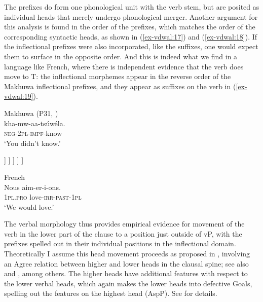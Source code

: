\documentclass[output=paper
,modfonts
,nonflat]{langsci/langscibook}
\begin{document}
The prefixes do form one phonological unit with the verb stem, but are posited as individual heads that merely undergo phonological merger. Another argument for this analysis is found in the order of the prefixes, which matches the order of the corresponding syntactic heads, as shown in (\ref{ex-vdwal:17}) and (\ref{ex-vdwal:18}). If the inflectional prefixes were also incorporated, like the suffixes, one would expect them to surface in the opposite order. And this is indeed what we find in a language like French, where there is independent evidence that the verb does move to T: the inflectional morphemes appear in the reverse order of the Makhuwa inflectional prefixes, and they appear as suffixes on the verb in (\ref{ex-vdwal:19}). 

\begin{exe}
		\ex Makhuwa (P31, \citealt[169]{Van_der_Wal2009})\label{ex-vdwal:17} \\
		\gll kha-mw-aa-tsúwéla.\\
		\textsc{neg}-\textsc{2pl}-\textsc{impf}-know\\
		\glt `You didn’t know.'
\end{exe}

\begin{exe}
	\ex\label{ex-vdwal:18} 
		\begin{forest}
			[NegP
			[kha-] 
			[AgrSP
			[-mw-] 
			[TAM
			[-aa-]
			[AspP
			[-tsuwela\textsubscript{i}]
			[vP [t\textsubscript{i}, roof
			]
			] ] ] ]	]			
	\end{forest}
\end{exe}
	\begin{exe}
		\ex French \label{ex-vdwal:19} \\
		\gll Nous aim-er-i-ons.\\
		1\textsc{pl}.\textsc{pro} love-\textsc{irr}-\textsc{past}-1\textsc{pl}\\
		\glt `We would love.'
\end{exe} 
The verbal morphology thus provides empirical evidence for movement of the verb in the lower part of the clause to a position just outside of vP, with the prefixes spelled out in their individual positions in the inflectional domain. Theoretically I assume this head movement proceeds as proposed in \citet{Roberts2010}, involving an Agree relation between higher and lower heads in the clausal spine; see also \citet{Adger2003} and \citet{Bjorkman2011}, among others. The higher heads have additional features with respect to the lower verbal heads, which again makes the lower heads into defective Goals, spelling out the features on the highest head (AspP). See \citet{Roberts2010} for details.
\end{document}
